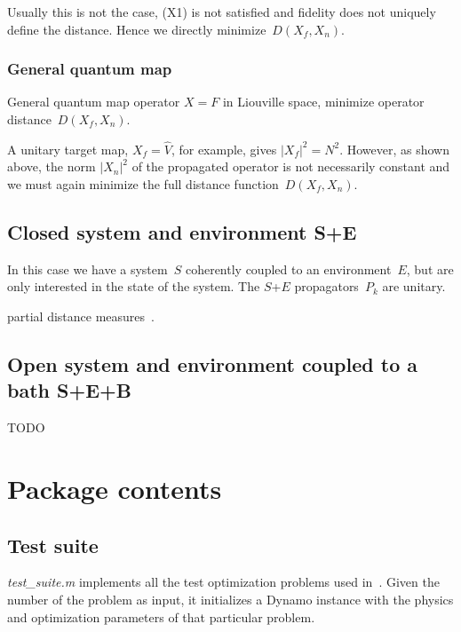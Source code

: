 \documentclass[aps, pra, a4paper, longbibliography]{revtex4}
\newcommand{\be}{\begin{equation}}
\newcommand{\ee}{\end{equation}}
\begin{document}
Usually this is not the case, (X1) is not satisfied and fidelity does not uniquely define the distance.
Hence we directly minimize~$D(X_f, X_n)$.



\subsubsection{General quantum map}

General quantum map operator $X = F$ in Liouville space,
minimize operator distance~$D(X_f, X_n)$.

A unitary target map,
$X_f = \hat{V}$, for example, gives $|X_f|^2 = N^2$.
However, as shown above, the norm $|X_n|^2$ of the propagated operator
is not necessarily constant and we must again minimize the full distance function~$D(X_f, X_n)$.




\subsection{Closed system and environment S+E}

In this case we have a system~$S$ coherently coupled to an
environment~$E$, but are only interested in the state of the system.
The $S$+$E$ propagators~$P_k$ are unitary.

partial distance measures~\cite{kosut_2006}.

\subsection{Open system and environment coupled to a bath S+E+B}

TODO




\section{Package contents}

\subsection{Test suite}
\emph{test\_suite.m} implements all the test optimization problems used in~\cite{machnes_2011}.
Given the number of the problem as input, it initializes a Dynamo
instance with the physics and optimization parameters of that particular problem.
\end{document}
